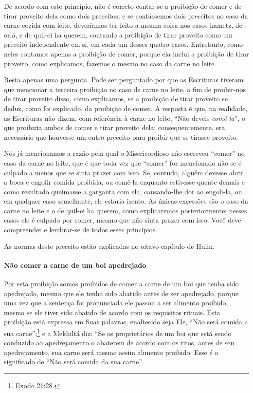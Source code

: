 De acordo com este princípio, não é correto contar-se a proibição de
comer e de tirar proveito dela como dois preceitos; e se contássemos
dois preceitos no caso da carne cozida com leite, deveríamos ter feito a
mesma coisa nos casos hametz, de
orlá,\starr{} e de quil-ei ha querem, contando a proibição de tirar proveito
como um preceito independente em si, em cada um desses quatro casos.
Entretanto, como neles contamos apenas a proibição de comer, porque ela
inclui a proibição de tirar proveito, como explicamos, fazemos o mesmo
no caso da carne no leite.

Resta apenas uma pergunta. Pode ser perguntado por que as Escrituras
tiveram que mencionar a terceira proibição no caso de carne no leite, a
fim de proibir-nos de tirar proveito disso, como explicamos, se a
proibição de tirar proveito se deduz, como foi explicado, da proibição
de comer. A resposta é que, na realidade, as Escrituras não dizem, com
referência à carne no leite, ``Não deveis \emph{comê-la}'', o que
proibiria ambos de comer e tirar proveito dela; consequentemente, era
necessário que houvesse um outro preceito para proibir que se tirasse
proveito.

Nós já mencionamos a razão pela qual o Misericordioso não escreveu
``comer'' no caso da carne no leite, que é que toda vez que ``comer''
for mencionado não se é culpado a menos que se sinta prazer com isso.
Se, contudo, alguém devesse abrir a boca e engolir comida proibida, ou
comê-la enquanto estivesse quente demais e como resultado queimasse a
garganta com ela, causando-lhe dor ao engoli-la, ou em qualquer caso
semelhante, ele estaria isento. As únicas exçessões são o caso da carne
no leite e o de quil-ei ha querem, como explicaremos posteriormente;
nesses casos ele é culpado por comer, mesmo que não sinta prazer com
isso. Você deve compreender e lembrar-se de todos esses princípios.

As normas deste preceito estão explicadas no oitavo capítulo de Hulin.

\paragraph{Não comer a carne de um boi apedrejado}

Por esta proibição somos proibidos de comer a carne de um boi que tenha
sido apedrejado, mesmo que ele tenha sido abatido antes de ser
apedrejado, porque uma vez que a sentença foi pronunciada ele passou a
ser alimento proibido, mesmo se ele tiver sido abatido de acordo com os
requisitos rituais. Esta proibição está expressa em Suas palavras,
enaltecido seja Ele, ``Não será comida a sua carne'';\footnote{Exodo 21:28.} e a
Mekhiltá diz: ``Se os proprietários de um boi que está sendo conduzido
ao apedrejamento o abaterem de acordo com os ritos, antes de seu
apedrejamento, sua carne será mesmo assim alimento proibido. Esse é o
significado de ``Não será comida da sua carne''.

